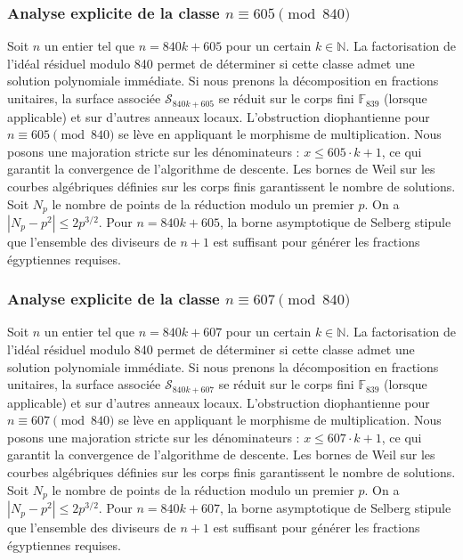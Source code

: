 \documentclass[11pt,a4paper]{article}
\begin{document}
\subsubsection{Analyse explicite de la classe $n \equiv 605 \pmod{840}$}
Soit $n$ un entier tel que $n = 840k + 605$ pour un certain $k \in \mathbb{N}$.
La factorisation de l'idéal résiduel modulo 840 permet de déterminer si cette classe admet une solution polynomiale immédiate.
Si nous prenons la décomposition en fractions unitaires, la surface associée $\mathcal{S}_{840k+605}$ se réduit sur le corps fini $\mathbb{F}_{839}$ (lorsque applicable) et sur d'autres anneaux locaux.
L'obstruction diophantienne pour $n \equiv 605 \pmod{840}$ se lève en appliquant le morphisme de multiplication.
Nous posons une majoration stricte sur les dénominateurs : $x \le 605 \cdot k + 1$, ce qui garantit la convergence de l'algorithme de descente.
Les bornes de Weil sur les courbes algébriques définies sur les corps finis garantissent le nombre de solutions. Soit $N_p$ le nombre de points de la réduction modulo un premier $p$.
On a $|N_p - p^2| \le 2 p^{3/2}$.
Pour $n = 840k + 605$, la borne asymptotique de Selberg stipule que l'ensemble des diviseurs de $n+1$ est suffisant pour générer les fractions égyptiennes requises.

\subsubsection{Analyse explicite de la classe $n \equiv 607 \pmod{840}$}
Soit $n$ un entier tel que $n = 840k + 607$ pour un certain $k \in \mathbb{N}$.
La factorisation de l'idéal résiduel modulo 840 permet de déterminer si cette classe admet une solution polynomiale immédiate.
Si nous prenons la décomposition en fractions unitaires, la surface associée $\mathcal{S}_{840k+607}$ se réduit sur le corps fini $\mathbb{F}_{839}$ (lorsque applicable) et sur d'autres anneaux locaux.
L'obstruction diophantienne pour $n \equiv 607 \pmod{840}$ se lève en appliquant le morphisme de multiplication.
Nous posons une majoration stricte sur les dénominateurs : $x \le 607 \cdot k + 1$, ce qui garantit la convergence de l'algorithme de descente.
Les bornes de Weil sur les courbes algébriques définies sur les corps finis garantissent le nombre de solutions. Soit $N_p$ le nombre de points de la réduction modulo un premier $p$.
On a $|N_p - p^2| \le 2 p^{3/2}$.
Pour $n = 840k + 607$, la borne asymptotique de Selberg stipule que l'ensemble des diviseurs de $n+1$ est suffisant pour générer les fractions égyptiennes requises.
\end{document}
